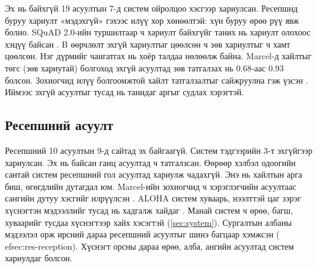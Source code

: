 Эх нь байхгүй 19 асуултын 7-д систем ойролцоо хэсгээр хариулсан. Ресепшнд буруу хариулт «мэдэхгүй» гэхээс илүү хор хөнөөлтэй: хүн буруу өрөө рүү явж болно. SQuAD 2.0-ийн туршилтаар ч хариулт байхгүйг таних нь хариулт олохоос хэцүү байсан \cite{rajpurkar2018squad2}. B өөрчлөлт эхгүй хариултыг цөөлсөн ч зөв хариултыг ч хамт цөөлсөн. Нэг дүрмийг чангатгах нь хоёр талдаа нөлөөлж байна. Marcel-д хайлтыг төгс (зөв хариутай) болгоход эхгүй асуултад зөв татгалзах нь 0.68-аас 0.93 болсон. Зохиогчид илүү болгоомжтой хайлт татгалзалтыг сайжруулна гэж үзсэн \cite{trienes2025marcel}. Иймээс эхгүй асуултыг тусад нь танидаг аргыг судлах хэрэгтэй.

\subsection{Ресепшний асуулт}

Ресепшний 10 асуултын 9-д сайтад эх байгаагүй. Систем тэдгээрийн 3-т эхгүйгээр хариулсан. Эх нь байсан ганц асуултад ч татгалзсан. Өөрөөр хэлбэл одоогийн сантай систем ресепшний гол асуултад хариулж чадахгүй. Энэ нь хайлтын арга биш, өгөгдлийн дутагдал юм. Marcel-ийн зохиогчид ч хэрэглэгчийн асуултаас сангийн дутуу хэсгийг илрүүлсэн \cite{trienes2025marcel}. ALOHA систем хуваарь, нээлттэй цаг зэрэг хүснэгтэн мэдээллийг тусад нь хадгалж хайдаг \cite{tao2025aloha}. Манай систем ч өрөө, багш, хуваарийг тусдаа хүснэгтээр хайх хэсэгтэй (\ref{sec:system}). Сургалтын албаны мэдээлэл орж ирсний дараа ресепшний асуултыг шинэ багцаар хэмжсэн (
ef{sec:res-reception}). Хүснэгт орсны дараа өрөө, алба, ангийн асуултад систем хариулдаг болсон.
